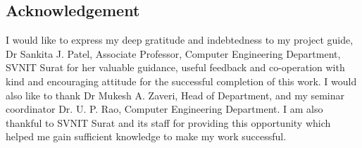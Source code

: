 \documentclass[12pt]{article}
\begin{document}
  \clearpage
    \begin{center}
        \huge{\section*{Acknowledgement}\label{sec:intro}}
    \end{center}
    I would like to express my deep gratitude and indebtedness to my project guide, Dr Sankita J. Patel, Associate Professor, Computer Engineering Department, SVNIT Surat for her valuable
    guidance, useful feedback and co-operation with kind and encouraging attitude for the successful completion of this work. I would also like to thank Dr Mukesh A. Zaveri, Head of
    Department, and my seminar coordinator Dr. U. P. Rao, Computer Engineering Department. I am also thankful to SVNIT Surat and its
    staff for providing this opportunity which helped me gain sufficient knowledge to make my work successful.
    
     
    
    \cleardoublepage
    
    \cleardoublepage
    \clearpage
\end{document}
